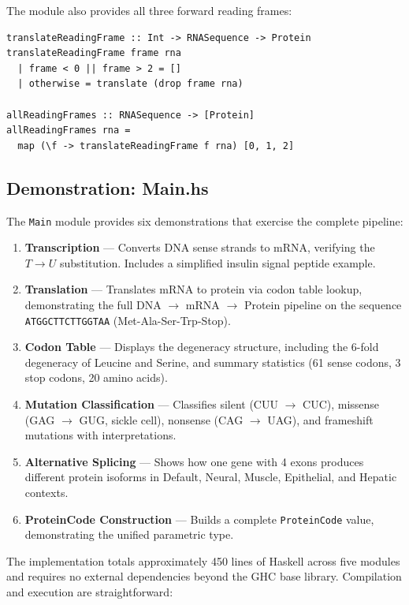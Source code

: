 \documentclass[12pt,a4paper]{article}
\theoremstyle{definition}
\begin{document}
The module also provides all three forward reading frames:

\begin{lstlisting}[caption={Reading frame analysis (Translation.hs)},label=lst:reading-frames]
translateReadingFrame :: Int -> RNASequence -> Protein
translateReadingFrame frame rna
  | frame < 0 || frame > 2 = []
  | otherwise = translate (drop frame rna)

allReadingFrames :: RNASequence -> [Protein]
allReadingFrames rna =
  map (\f -> translateReadingFrame f rna) [0, 1, 2]
\end{lstlisting}

\subsection{Demonstration: Main.hs}\label{sec:impl-main}

The \texttt{Main} module provides six demonstrations that exercise the complete pipeline:

\begin{enumerate}[label=\textbf{Demo \arabic*:}]
  \item \textbf{Transcription} --- Converts DNA sense strands to mRNA, verifying the $T \to U$ substitution. Includes a simplified insulin signal peptide example.
  \item \textbf{Translation} --- Translates mRNA to protein via codon table lookup, demonstrating the full DNA $\to$ mRNA $\to$ Protein pipeline on the sequence \texttt{ATGGCTTCTTGGTAA} (Met-Ala-Ser-Trp-Stop).
  \item \textbf{Codon Table} --- Displays the degeneracy structure, including the 6-fold degeneracy of Leucine and Serine, and summary statistics (61 sense codons, 3 stop codons, 20 amino acids).
  \item \textbf{Mutation Classification} --- Classifies silent (CUU $\to$ CUC), missense (GAG $\to$ GUG, sickle cell), nonsense (CAG $\to$ UAG), and frameshift mutations with interpretations.
  \item \textbf{Alternative Splicing} --- Shows how one gene with 4 exons produces different protein isoforms in Default, Neural, Muscle, Epithelial, and Hepatic contexts.
  \item \textbf{ProteinCode Construction} --- Builds a complete \texttt{ProteinCode} value, demonstrating the unified parametric type.
\end{enumerate}

The implementation totals approximately 450 lines of Haskell across five modules and requires no external dependencies beyond the GHC base library. Compilation and execution are straightforward:
\end{document}
